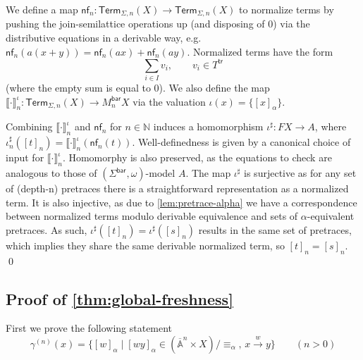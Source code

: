 \documentclass[a4paper,UKenglish,cleveref,thm-restate,numberwithinsect,final]{lipics-v2021}
\newcommand{\Br}{\mathsf{bar}}
\newcommand{\trc}{\mathsf{tr}}
\newcommand{\pre}{\mathsf{pre}}
\newcommand{\abs}{\mathsf{abs}}
\newcommand{\Term}{\mathsf{Term}}
\newcommand{\Names}{\mathbb{A}}
\newcommand{\barNames}{\overline{\Names}}
\newcommand{\alphaeq}{\equiv_\alpha}
\theoremstyle{plain}
\newcommand{\midmid}{\hspace{0.2ex}{\rule[-0.1ex]{0.6pt}{1.65ex}}\hspace{0.2ex}}
\newcommand{\newletter}[1]{{\midmid}#1}
\numberwithin{equation}{section}
\newcommand{\sem}[1]{\llbracket #1 \rrbracket}
\newcommand{\Nat}{{\mathbb{N}}}
\newcommand{\+}[1]{\mathcal{#1}\xspace}
\theoremstyle{definition}
\begin{document}
We define a map $\mathsf{nf}_n \colon \Term_{\Sigma,n}(X) \to \Term_{\Sigma,n}(X)$ to normalize terms by pushing the join-semilattice operations up (and disposing of $0$) via the distributive equations in a derivable way, e.g. $\mathsf{nf}_n(a(x + y)) = \mathsf{nf}_n(ax) + \mathsf{nf}_n(ay)$. Normalized terms have the form
\[\sum_{i \in I} v_i, \qquad v_i \in T^\trc \] (where the empty sum is equal to $0$).
We also define the map $\sem{\cdot}^\iota_n \colon \Term_{\Sigma,n}(X) \to M^\Br_n X$ via the valuation $\iota(x) = \{[x]_\alpha\}$.

Combining $\sem{\cdot}^\iota_n$ and $\mathsf{nf}_n$ for $n \in \Nat$ induces a homomorphism $\iota^\sharp\colon FX \to A$, where $\iota^\sharp_n([t]_n) = \sem{\cdot}^\iota_n(\mathsf{nf}_n(t))$.
Well-definedness is given by a canonical choice of input for $\sem{\cdot}^\iota_n$. Homomorphy is also preserved, as the equations to check are analogous to those of $(\Sigma^\Br, \omega)$-model $A$. The map $\iota^\sharp$ is surjective as for any set of (depth-n) pretraces there is a straightforward representation as a normalized term. It is also injective, as due to \cref{lem:pretrace-alpha} we have a correspondence between normalized terms modulo derivable equivalence and sets of $\alpha$-equivalent pretraces. As such, $\iota^\sharp([t]_n) = \iota^\sharp([s]_n)$ results in the same set of pretraces, which implies they share the same derivable normalized term, so $[t]_n = [s]_n$.
\qed

\subsection*{Proof of \cref{thm:global-freshness}}

First we prove the following statement
\begin{equation*}
    \gamma^{(n)}(x) = \{[w]_\alpha \mid [wy]_\alpha \in (\barNames^n\times X) / {\alphaeq}, \, x \xrightarrow{w} y\} \qquad (n > 0)
\end{equation*}
\end{document}
